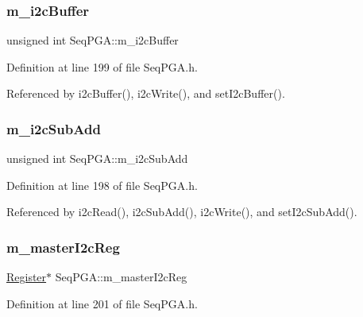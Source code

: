 \subsubsection{\texorpdfstring{m\+\_\+i2c\+Buffer}{m\_i2cBuffer}}
{\footnotesize\ttfamily unsigned int Seq\+P\+G\+A\+::m\+\_\+i2c\+Buffer\hspace{0.3cm}{\ttfamily [private]}}



Definition at line 199 of file Seq\+P\+G\+A.\+h.



Referenced by i2c\+Buffer(), i2c\+Write(), and set\+I2c\+Buffer().

\mbox{\label{classSeqPGA_a82bda98edb9681aff47733e83ac8bc4f}} 
\subsubsection{\texorpdfstring{m\+\_\+i2c\+Sub\+Add}{m\_i2cSubAdd}}
{\footnotesize\ttfamily unsigned int Seq\+P\+G\+A\+::m\+\_\+i2c\+Sub\+Add\hspace{0.3cm}{\ttfamily [private]}}



Definition at line 198 of file Seq\+P\+G\+A.\+h.



Referenced by i2c\+Read(), i2c\+Sub\+Add(), i2c\+Write(), and set\+I2c\+Sub\+Add().

\mbox{\label{classSeqPGA_a942c71b33a4f43b7a994cb9216abb17e}} 
\subsubsection{\texorpdfstring{m\+\_\+master\+I2c\+Reg}{m\_masterI2cReg}}
{\footnotesize\ttfamily \hyperlink{classRegister}{Register}$\ast$ Seq\+P\+G\+A\+::m\+\_\+master\+I2c\+Reg\hspace{0.3cm}{\ttfamily [private]}}



Definition at line 201 of file Seq\+P\+G\+A.\+h.



